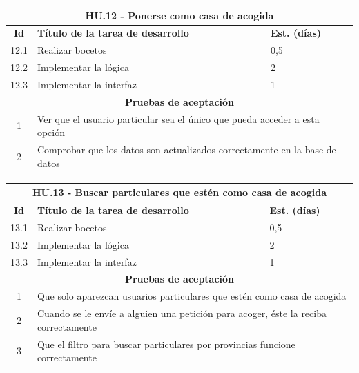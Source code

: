 \begin{table}[H]
	\centering
\begin{tabular}{|c|p{9.5cm}|p{1cm}|}
	\hline
	\multicolumn{3}{|c|}{\textbf{HU.12 - Ponerse como casa de acogida}} \\
	\hline
	\textbf{Id} & \textbf{Título de la tarea de desarrollo} & \textbf{Est. (días)} \\
	\hline
	12.1 & Realizar bocetos & 0,5 \\ \hline
	12.2 &  Implementar la lógica & 2 \\ \hline
	12.3 &  Implementar la interfaz & 1 \\ \hline
	\multicolumn{3}{|c|}{\textbf{Pruebas de aceptación}} \\ \hline
	1 & \multicolumn{2}{|p{10cm}|}{Ver que el usuario particular sea el único que pueda acceder a esta opción} \\ \hline
	2 & \multicolumn{2}{|p{10cm}|}{Comprobar que los datos son actualizados correctamente en la base de datos} \\ \hline
	
\end{tabular}
\end{table}

\begin{table}[H]
	\centering
	\hspace*{-0.5cm}
\begin{tabular}{|c|p{9.5cm}|p{1cm}|}
	\hline
	\multicolumn{3}{|p{12.5cm}|}{\textbf{HU.13 - Buscar particulares que estén como casa de acogida}} \\
	\hline
	\textbf{Id} & \textbf{Título de la tarea de desarrollo} & \textbf{Est. (días)} \\
	\hline
	13.1 & Realizar bocetos & 0,5 \\ \hline
	13.2 &  Implementar la lógica & 2 \\ \hline
	13.3 &  Implementar la interfaz & 1 \\ \hline
	\multicolumn{3}{|c|}{\textbf{Pruebas de aceptación}} \\ \hline
	1 & \multicolumn{2}{|p{12cm}|}{Que solo aparezcan usuarios particulares que estén como casa de acogida} \\ \hline
	2 & \multicolumn{2}{|p{12cm}|}{Cuando se le envíe a alguien una petición para acoger, éste la reciba correctamente} \\ \hline
	3 & \multicolumn{2}{|p{12cm}|}{Que el filtro para buscar particulares por provincias funcione correctamente} \\ \hline
	
\end{tabular} 
\end{table}

